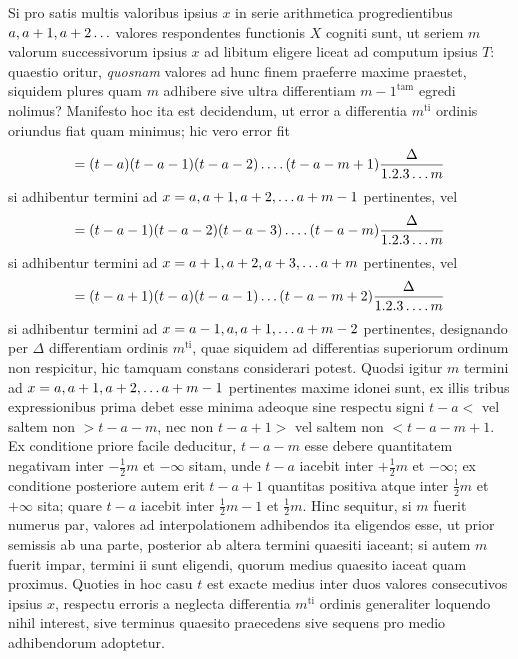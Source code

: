 Si pro satis multis valoribus ipsius \(x\) in serie arithmetica progredientibus
\(a,a+1,a+2\mathinner{.\,.\,.}\) valores respondentes functionis \(X\) cogniti sunt, ut seriem \(m\)
valorum successivorum ipsius \(x\) ad libitum eligere liceat ad computum ipsius \(T\):
quaestio oritur, \emph{quosnam} valores ad hunc finem praeferre maxime praestet, siquidem plures quam \(m\) adhibere sive ultra differentiam \(m-1^{\mathrm{tam}}\) egredi nolimus?
Manifesto hoc ita est decidendum, ut error a differentia \(m^{\mathrm{ti}}\) ordinis oriundus fiat
quam minimus; hic vero error fit
\[
=(t-a)(t-a-1)(t-a-2)\mathinner{.\,.\,.\,.}(t-a-m+1)\frac{\Delta}{1.2.3\mathinner{.\,.\,.} m}
\]
si adhibentur termini ad \(x=a,a+1,a+2,\mathinner{.\,.\,.} a+m-1\) pertinentes, vel
\[
=(t-a-1)(t-a-2)(t-a-3)\mathinner{.\,.\,.\,.}(t-a-m)\frac{\Delta}{1.2.3\mathinner{.\,.\,.} m}
\]
si adhibentur termini ad \(x=a+1,a+2,a+3,\mathinner{.\,.\,.} a+m\) pertinentes, vel
\[
=(t-a+1)(t-a)(t-a-1)\mathinner{.\,.\,.}(t-a-m+2)\frac{\Delta}{1.2.3\mathinner{.\,.\,.\,.}m}
\]
si adhibentur termini ad \(x=a-1,a,a+1,\mathinner{.\,.\,.} a+m-2\) pertinentes, designando
per \(\Delta\) differentiam ordinis \(m^{\mathrm{ti}}\), quae siquidem ad differentias superiorum ordinum
non respicitur, hic tamquam constans considerari potest. Quodsi igitur \(m\) termini
ad \(x=a,a+1,a+2,\mathinner{.\,.\,.} a+m-1\) pertinentes maxime idonei sunt, ex illis
tribus expressionibus prima debet esse minima adeoque sine respectu signi \(t-a<\)
vel saltem non \(>t-a-m\), nec non \(t-a+1>\) vel saltem non \(<t-a-m+1\).
Ex conditione priore facile deducitur, \(t-a-m\) esse debere quantitatem negativam inter \(-\frac12m\) et \(-\infty\) sitam, unde \(t-a\) iacebit inter \(+\frac12m\) et \(-\infty\); ex
conditione posteriore autem erit \(t-a+1\) quantitas positiva atque inter \(\frac12m\) et
\(+\infty\) sita; quare \(t-a\) iacebit inter \(\frac12m-1\) et \(\frac12m\). Hinc sequitur, si \(m\) fuerit numerus par, valores ad interpolationem adhibendos ita eligendos esse, ut
prior semissis ab una parte, posterior ab altera termini quaesiti iaceant; si autem
\(m\) fuerit impar, termini ii sunt eligendi, quorum medius quaesito iaceat quam
proximus. Quoties in hoc casu \(t\) est exacte medius inter duos valores consecutivos ipsius \(x\), respectu erroris a neglecta differentia \(m^{\mathrm{ti}}\) ordinis generaliter loquendo nihil interest, sive terminus quaesito praecedens sive sequens pro medio
adhibendorum adoptetur.

